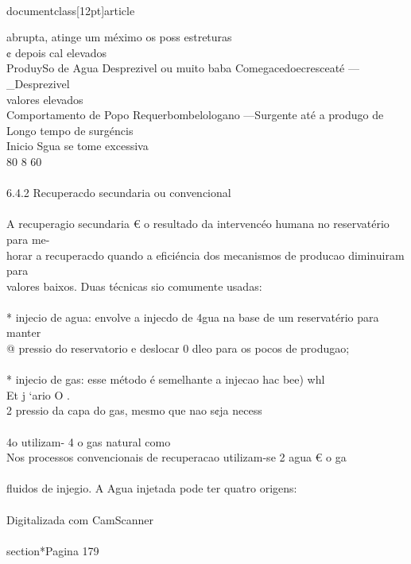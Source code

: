 \\documentclass[12pt]{article}
\begin{document}
{abrupta, atinge um méximo os poss estreturas\\
¢ depois cal elevados\\
ProduySo de Agua Desprezivel ou muito baba Comegacedoecresceaté —\\_Desprezivel\\
valores elevados\\
Comportamento de Popo Requerbombelologano —Surgente até a produgo de Longo tempo de surgéncis\\
Inicio Sgua se tome excessiva\\
80 8 60\\%
\\
6.4.2 Recuperacdo secundaria ou convencional\\
\\
A recuperagio secundaria € o resultado da intervencéo humana no reservatério para me-\\
horar a recuperacdo quando a eficiéncia dos mecanismos de producao diminuiram para\\
valores baixos. Duas técnicas sio comumente usadas:\\
\\
* injecio de agua: envolve a injecdo de 4gua na base de um reservatério para manter\\
@ pressio do reservatorio e deslocar 0 dleo para os pocos de produgao;\\
\\
* injecio de gas: esse método é semelhante a injecao hac bee) whl\\
Et j ‘ario O .\\
2 pressio da capa do gas, mesmo que nao s¢ja necess\\
\\
4o utilizam- 4 o gas natural como\\
Nos processos convencionais de recuperacao utilizam-se 2 agua € o ga\\
\\
fluidos de injegio. A Agua injetada pode ter quatro origens:\\
\\
Digitalizada com CamScanner\\

\\section*{Pagina 179}

}
\end{document}
